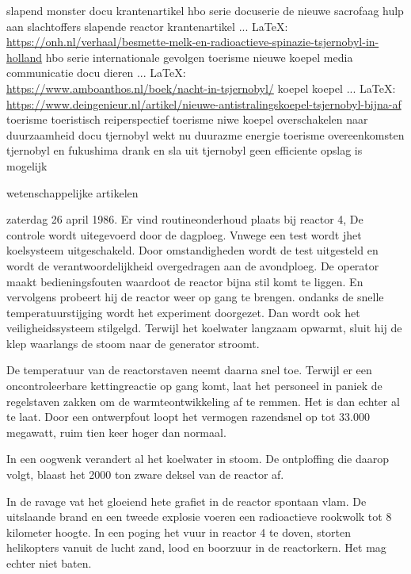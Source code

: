 \begin{thebibliography}{99}
{{{	slapend monster
	docu
	krantenartikel
	hbo serie
	docuserie
	de  nieuwe sacrofaag
	hulp aan slachtoffers
	slapende reactor
	krantenartikel
	 ... \LaTeX:\\ \url{https://onh.nl/verhaal/besmette-melk-en-radioactieve-spinazie-tsjernobyl-in-holland}
	hbo serie
	internationale gevolgen
	toerisme
	nieuwe koepel
	media communicatie
	docu
	dieren
	 ... \LaTeX:\\ \url{https://www.amboanthos.nl/boek/nacht-in-tsjernobyl/}
	koepel
	koepel
	 ... \LaTeX:\\ \url{https://www.deingenieur.nl/artikel/nieuwe-antistralingskoepel-tsjernobyl-bijna-af}
	toerisme
	toeristisch reiperspectief
	toerisme
	niwe koepel
	overschakelen naar duurzaamheid
	docu
	tjernobyl wekt nu duurazme energie
	toerisme
	overeenkomsten tjernobyl en fukushima
	drank en sla uit tjernobyl
	geen efficiente opslag is mogelijk
	
	wetenschappelijke artikelen
	
	zaterdag 26 april 1986. Er vind routineonderhoud plaats bij reactor 4, De controle wordt uitegevoerd door de dagploeg. Vnwege een test wordt jhet koelsysteem uitgeschakeld. Door omstandigheden wordt de test uitgesteld en wordt de verantwoordelijkheid overgedragen aan de avondploeg.
	De operator maakt bedieningsfouten waardoot de reactor bijna stil komt te liggen. En vervolgens probeert hij de reactor weer op gang te brengen. ondanks de snelle temperatuurstijging wordt het experiment doorgezet. Dan wordt ook het veiligheidssysteem stilgelgd. Terwijl het koelwater langzaam opwarmt, sluit hij de klep waarlangs de stoom naar de generator stroomt.
	
	De temperatuur van de reactorstaven neemt daarna snel toe. Terwijl er een oncontroleerbare kettingreactie op gang komt, laat het personeel in paniek de regelstaven zakken om de warmteontwikkeling af te remmen. Het is dan echter al te laat. Door een ontwerpfout loopt het vermogen razendsnel op tot 33.000 megawatt, ruim tien keer hoger dan normaal.
	
	In een oogwenk verandert al het koelwater in stoom. De ontploffing die daarop volgt, blaast het 2000 ton zware deksel van de reactor af.}

In de ravage vat het gloeiend hete grafiet in de reactor spontaan vlam. De uitslaande brand en een tweede explosie voeren een radioactieve rookwolk tot 8 kilometer hoogte. 
In een poging het vuur in reactor 4 te doven, storten helikopters vanuit de lucht zand, lood en boorzuur in de reactorkern. Het mag echter niet baten.

}}
\end{thebibliography}
